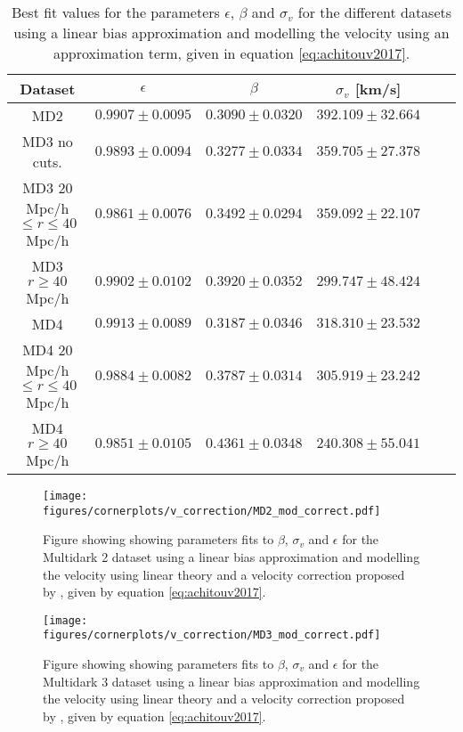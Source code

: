 \begin{table}
    \centering
    \footnotesize
    \begin{tabular}{| c | c | c | c | c | c |}
        \hline
        Dataset& $\epsilon$ & $\beta$ & $\sigma_v$ [km/s]  \\
        \hline
        MD2& $0.9907\pm 0.0095$ & $0.3090\pm 0.0320$ & $392.109\pm 32.664$\\ 
        MD3 no cuts. & $0.9893\pm 0.0094$ & $0.3277\pm 0.0334$ & $359.705\pm 27.378$\\
        MD3 $20$Mpc/h$\leq r\leq 40$ Mpc/h & $0.9861\pm 0.0076$ & $0.3492\pm 0.0294$ & $359.092\pm 22.107$\\
        MD3 $r\geq 40$Mpc/h & $0.9902\pm 0.0102$ & $0.3920\pm 0.0352$ & $299.747\pm 48.424$\\
        MD4 & $0.9913\pm 0.0089$ &  $0.3187\pm 0.0346$ & $318.310\pm 23.532$\\
        MD4 $20$Mpc/h$\leq r\leq 40$ Mpc/h & $0.9884\pm 0.0082$ & $0.3787\pm 0.0314$ & $305.919\pm 23.242$\\
        MD4 $r\geq 40$ Mpc/h & $0.9851\pm 0.0105$ & $0.4361\pm 0.0348$ & $240.308\pm 55.041$ \\
        \hline
    \end{tabular}
    
    \caption{Best fit values for the parameters $\epsilon$, $\beta$ and $\sigma_v$ for the different datasets using a linear bias approximation and modelling the velocity using an approximation term, given in equation \ref{eq:achitouv2017}.}
    \label{tab:MD_linbiasachitouv}
\end{table}

\begin{figure}[H]
    \texttt{[image: figures/cornerplots/v\_correction/MD2\_mod\_correct.pdf]}
    \caption{Figure showing showing parameters fits to $\beta$, $\sigma_v$ and $\epsilon$ for the Multidark 2 dataset using a linear bias approximation and modelling the velocity using linear theory and a velocity correction proposed by \cite{Achitouv_streaming}, given by equation \ref{eq:achitouv2017}.}
    \label{fig:linbiasMD2mod}
\end{figure}

\begin{figure}[H]
    \texttt{[image: figures/cornerplots/v\_correction/MD3\_mod\_correct.pdf]}
    \caption{Figure showing showing parameters fits to $\beta$, $\sigma_v$ and $\epsilon$ for the Multidark 3 dataset using a linear bias approximation and modelling the velocity using linear theory and a velocity correction proposed by \cite{Achitouv_streaming}, given by equation \ref{eq:achitouv2017}.}
    \label{fig:linbiasMD3mod}
\end{figure}

